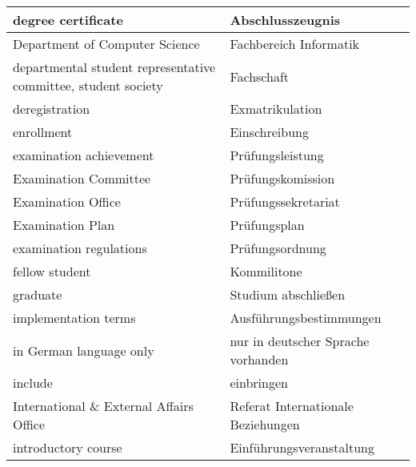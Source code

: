 \begin{longtable} {|p{.5\linewidth}|p{.5\linewidth}|}
    \hline
    degree certificate                                             & Abschlusszeugnis                    \\
    \hline
    Department of Computer Science                                 & Fachbereich Informatik              \\
    \hline
    departmental student representative committee, student society & Fachschaft                          \\
    \hline
    deregistration                                                 & Exmatrikulation                     \\
    \hline
    enrollment                                                     & Einschreibung                       \\
    \hline
    examination achievement                                        & Prüfungsleistung                    \\
    \hline
    Examination Committee                                          & Prüfungskomission                   \\
    \hline
    Examination Office                                             & Prüfungssekretariat                 \\
    \hline
    Examination Plan                                               & Prüfungsplan                        \\
    \hline
    examination regulations                                        & Prüfungsordnung                     \\
    \hline
    fellow student                                                 & Kommilitone                         \\
    \hline
    graduate                                                       & Studium abschließen                 \\
    \hline
    implementation terms                                           & Ausführungsbestimmungen             \\
    \hline
    in German language only                                        & nur in deutscher Sprache vorhanden  \\
    \hline
    include                                                        & einbringen                          \\
    \hline
    International \& External Affairs Office                       & Referat Internationale Beziehungen  \\
    \hline
    introductory course                                            & Einführungsveranstaltung            \\

\end{longtable}
